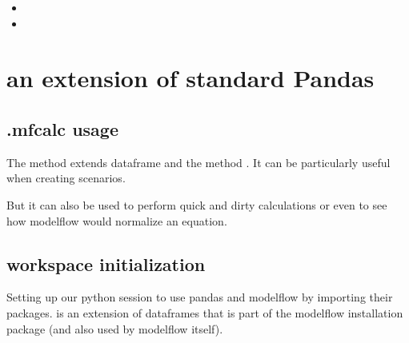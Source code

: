 \documentclass[letterpaper,10pt,english]{jupyterBook}
\begin{document}
\sphinxAtStartPar
{}
\begin{itemize}
\item {} 
\sphinxAtStartPar
{}

\item {} 
\sphinxAtStartPar
{}

\end{itemize}

\sphinxstepscope


\chapter{ an extension of standard Pandas}
\label{\detokenize{content/04_PythonEssentials/ExtendingDataFrames:mfcalc-an-extension-of-standard-pandas}}\label{\detokenize{content/04_PythonEssentials/ExtendingDataFrames::doc}}

\section{.mfcalc usage}
\label{\detokenize{content/04_PythonEssentials/ExtendingDataFrames:mfcalc-usage}}
\sphinxAtStartPar
The  method extends dataframe and the method .  It can be particularly useful when creating scenarios.

\sphinxAtStartPar
But it can also be used to perform quick and dirty  calculations or even to see how modelflow would normalize an equation.


\section{workspace initialization}
\label{\detokenize{content/04_PythonEssentials/ExtendingDataFrames:workspace-initialization}}
\sphinxAtStartPar
Setting up our python session to use pandas and modelflow by importing their packages.   is an extension of dataframes that is part of the modelflow installation package (and also used by modelflow itself).
\end{document}
